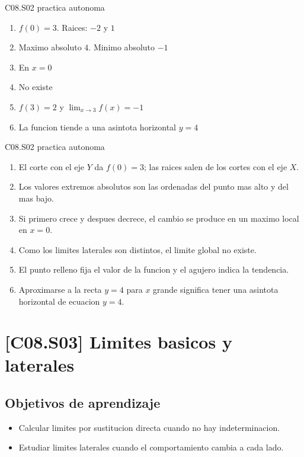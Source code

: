 \begin{shortanswer}{C08.S02 practica autonoma}
\begin{enumerate}[label=\textbf{PX-C08.S02-\arabic*:}, leftmargin=*]
  \item \(f(0)=3\). Raices: \(-2\) y \(1\)
  \item Maximo absoluto \(4\). Minimo absoluto \(-1\)
  \item En \(x=0\)
  \item No existe
  \item \(f(3)=2\) y \(\lim_{x\to 3}f(x)=-1\)
  \item La funcion tiende a una asintota horizontal \(y=4\)
\end{enumerate}
\end{shortanswer}

\begin{fullsolution}{C08.S02 practica autonoma}
\begin{enumerate}[label=\textbf{PX-C08.S02-\arabic*:}, leftmargin=*]
  \item El corte con el eje \(Y\) da \(f(0)=3\); las raices salen de los cortes con el eje \(X\).
  \item Los valores extremos absolutos son las ordenadas del punto mas alto y del mas bajo.
  \item Si primero crece y despues decrece, el cambio se produce en un maximo local en \(x=0\).
  \item Como los limites laterales son distintos, el limite global no existe.
  \item El punto relleno fija el valor de la funcion y el agujero indica la tendencia.
  \item Aproximarse a la recta \(y=4\) para \(x\) grande significa tener una asintota
  horizontal de ecuacion \(y=4\).
\end{enumerate}
\end{fullsolution}

\section{[C08.S03] Limites basicos y laterales}

\subsection*{Objetivos de aprendizaje}
\begin{itemize}
  \item Calcular limites por sustitucion directa cuando no hay indeterminacion.
  \item Estudiar limites laterales cuando el comportamiento cambia a cada lado.
\end{itemize}

